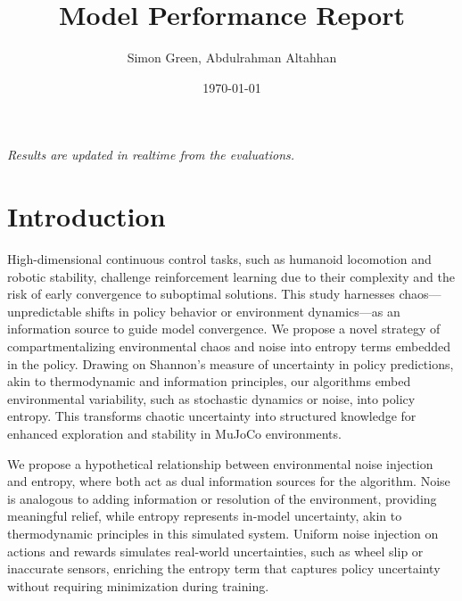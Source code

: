 \documentclass{svproc}
\begin{document}
\title{Model Performance Report}
\author{Simon Green, Abdulrahman Altahhan}
\date{\today}
\maketitle
\begin{center}
  {\it Results are updated in realtime from the evaluations.}
\end{center}

\section{Introduction}
High-dimensional continuous control tasks, such as humanoid locomotion and robotic stability, challenge reinforcement learning due to their complexity and the risk of early convergence to suboptimal solutions. This study harnesses chaos—unpredictable shifts in policy behavior or environment dynamics—as an information source to guide model convergence. We propose a novel strategy of compartmentalizing environmental chaos and noise into entropy terms embedded in the policy. Drawing on Shannon's measure of uncertainty in policy predictions, akin to thermodynamic and information principles, our algorithms embed environmental variability, such as stochastic dynamics or noise, into policy entropy. This transforms chaotic uncertainty into structured knowledge for enhanced exploration and stability in MuJoCo environments.

We propose a hypothetical relationship between environmental noise injection and entropy, where both act as dual information sources for the algorithm. Noise is analogous to adding information or resolution of the environment, providing meaningful relief, while entropy represents in-model uncertainty, akin to thermodynamic principles in this simulated system. Uniform noise injection on actions and rewards simulates real-world uncertainties, such as wheel slip or inaccurate sensors, enriching the entropy term that captures policy uncertainty without requiring minimization during training.
\end{document}
